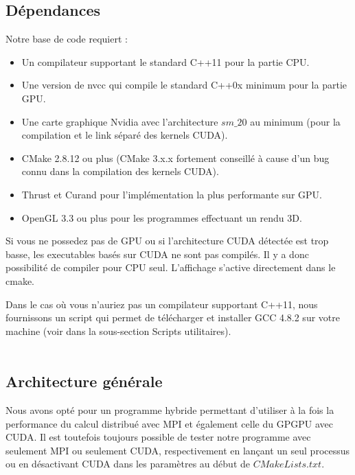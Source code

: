 \documentclass[12pt,a4paper,sans]{article}
\begin{document}
\subsection{Dépendances}
Notre base de code requiert :
\begin{itemize}
    \item Un compilateur supportant le standard C++11 pour la partie CPU.
    \item Une version de nvcc qui compile le standard C++0x minimum pour la partie GPU.
    \item Une carte graphique Nvidia avec l'architecture $sm\_20$ au minimum (pour la compilation et le link séparé des kernels CUDA).
    \item CMake 2.8.12 ou plus (CMake 3.x.x fortement conseillé à cause d'un bug connu dans la compilation des kernels CUDA).
    \item Thrust et Curand pour l'implémentation la plus performante sur GPU.
    \item OpenGL 3.3 ou plus pour les programmes effectuant un rendu 3D.
\end{itemize}


Si vous ne possedez pas de GPU ou si l'architecture CUDA détectée est trop basse, les executables basés sur CUDA ne sont pas compilés.
Il y a donc possibilité de compiler pour CPU seul. L'affichage s'active directement dans le cmake.

Dans le cas où vous n'auriez pas un compilateur supportant C++11, nous fournissons un script qui permet de télécharger et installer GCC 4.8.2 sur votre machine (voir dans la sous-section Scripts utilitaires).\\\\

\subsection{Architecture générale}
Nous avons opté pour un programme hybride permettant d'utiliser à la fois la performance du calcul distribué avec MPI et également celle du GPGPU avec CUDA. Il est toutefois toujours possible de tester notre programme avec seulement MPI ou seulement CUDA, respectivement en lançant un seul processus ou en désactivant CUDA dans les paramètres au début de $CMakeLists.txt$.\\\\
\end{document}
